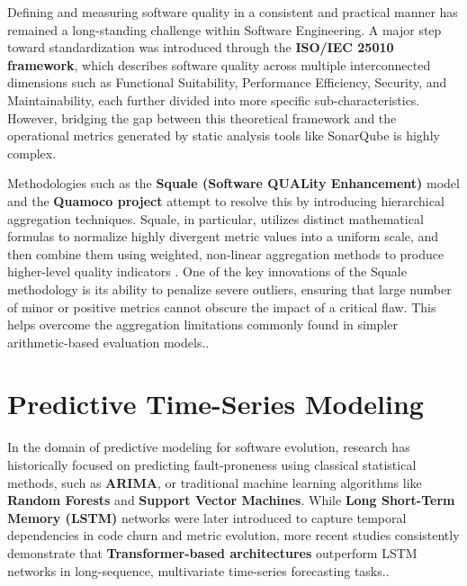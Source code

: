 Defining and measuring software quality in a consistent and practical manner has remained a long-standing challenge within Software Engineering. A major step toward standardization was introduced through the \textbf{ISO/IEC 25010 framework}, which describes software quality across multiple interconnected dimensions such as Functional Suitability, Performance Efficiency, Security, and Maintainability, each further divided into more specific sub-characteristics.\parencite{isoiec25010} However, bridging the gap between this theoretical framework and the operational metrics generated by static analysis tools like SonarQube is highly complex. 

Methodologies such as the \textbf{Squale (Software QUALity Enhancement)} model and the \textbf{Quamoco project} attempt to resolve this by introducing hierarchical aggregation techniques\parencite{quamoco_product_quality_modelling_assessment}. Squale, in particular, utilizes distinct mathematical formulas to normalize highly divergent metric values into a uniform scale, and then combine them using weighted, non-linear aggregation methods to produce higher-level quality indicators \parencite{computing_weighted_average_in_squale}. One of the key innovations of the Squale methodology is its ability to penalize severe outliers, ensuring that large number of minor or positive metrics cannot obscure the impact of a critical flaw. This helps overcome the aggregation limitations commonly found in simpler arithmetic-based evaluation models.\parencite{mord11a_continuous_weighted_metric_aggregation}.

\section{Predictive Time-Series Modeling}

In the domain of predictive modeling for software evolution, research has historically focused on predicting fault-proneness using classical statistical methods, such as \textbf{ARIMA}, or traditional machine learning algorithms like \textbf{Random Forests} and \textbf{Support Vector Machines}\parencite{software_service_supporting_software_quality_forecasting}. While \textbf{Long Short-Term Memory (LSTM)} networks were later introduced to capture temporal dependencies in code churn and metric evolution, more recent studies consistently demonstrate that \textbf{Transformer-based architectures} outperform LSTM networks in long-sequence, multivariate time-series forecasting tasks.\parencite{comparative_analysis_lstm_gru_transformer_construction_cost}. 

